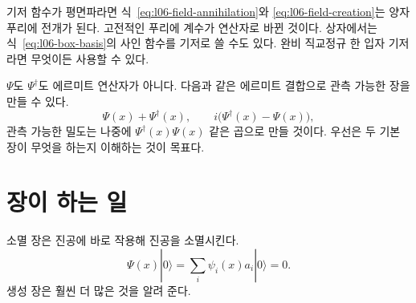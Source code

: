 기저 함수가 평면파라면 식~\eqref{eq:l06-field-annihilation}와 \eqref{eq:l06-field-creation}는 양자 푸리에 전개가 된다. 고전적인 푸리에 계수가 연산자로 바뀐 것이다. 상자에서는 식~\eqref{eq:l06-box-basis}의 사인 함수를 기저로 쓸 수도 있다. 완비 직교정규 한 입자 기저라면 무엇이든 사용할 수 있다.

\(\Psi\)도 \(\Psi^\dagger\)도 에르미트 연산자가 아니다. 다음과 같은 에르미트 결합으로 관측 가능한 장을 만들 수 있다.
\begin{equation}
\Psi(x)+\Psi^\dagger(x),
\qquad
i\bigl(\Psi^\dagger(x)-\Psi(x)\bigr),
\end{equation}
관측 가능한 밀도는 나중에 \(\Psi^\dagger(x)\Psi(x)\) 같은 곱으로 만들 것이다. 우선은 두 기본 장이 무엇을 하는지 이해하는 것이 목표다.

\begin{classroomqa}\end{classroomqa}

\section{장이 하는 일}

소멸 장은 진공에 바로 작용해 진공을 소멸시킨다.
\begin{equation}
\Psi(x)|0\rangle
=\sum_i\psi_i(x)a_i|0\rangle
=0.
\label{eq:l06-field-kills-vacuum}
\end{equation}
생성 장은 훨씬 더 많은 것을 알려 준다.

